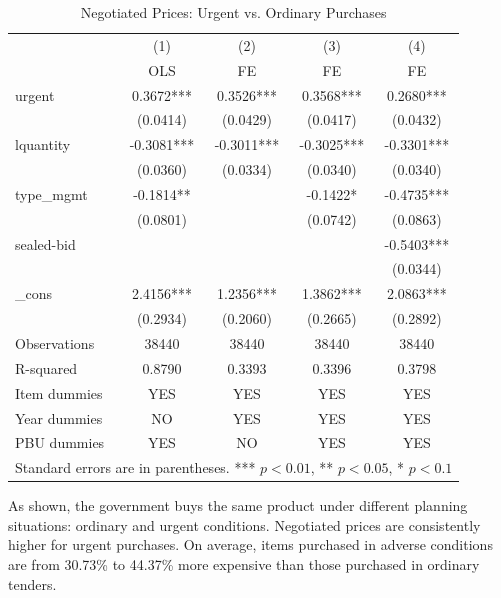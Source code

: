 \begin{table}[ht]
  \centering
  \caption{Negotiated Prices: Urgent vs. Ordinary Purchases}
  \begin{tabular}{lcccc}
    \hline
           & (1)        & (2)        & (3)        & (4)        \\
           & OLS       & FE         & FE         & FE         \\
    \hline
    urgent     & 0.3672*** & 0.3526*** & 0.3568*** & 0.2680*** \\
               & (0.0414)  & (0.0429)  & (0.0417)  & (0.0432)  \\
    lquantity  & -0.3081*** & -0.3011*** & -0.3025*** & -0.3301*** \\
               & (0.0360)   & (0.0334)   & (0.0340)   & (0.0340)   \\
    type\_mgmt & -0.1814**  &           & -0.1422*  & -0.4735*** \\
               & (0.0801)  &           & (0.0742)  & (0.0863)   \\
    sealed-bid &           &           &           & -0.5403*** \\
               &           &           &           & (0.0344)   \\
    \_cons     & 2.4156*** & 1.2356*** & 1.3862*** & 2.0863*** \\
               & (0.2934)  & (0.2060)  & (0.2665)  & (0.2892)  \\
    Observations & 38440   & 38440     & 38440     & 38440     \\
    R-squared  & 0.8790    & 0.3393    & 0.3396    & 0.3798    \\
    Item dummies & YES     & YES       & YES       & YES       \\
    Year dummies & NO      & YES       & YES       & YES       \\
    PBU dummies & YES      & NO        & YES       & YES       \\
    \hline
    \multicolumn{5}{l}{\footnotesize Standard errors are in parentheses. *** $p<0.01$, ** $p<0.05$, * $p<0.1$}
  \end{tabular}
\end{table}

As shown, the government buys the same product under different planning situations: ordinary and urgent conditions. Negotiated prices are consistently higher for urgent purchases. On average, items purchased in adverse conditions are from 30.73\% to 44.37\% more expensive than those purchased in ordinary tenders.

